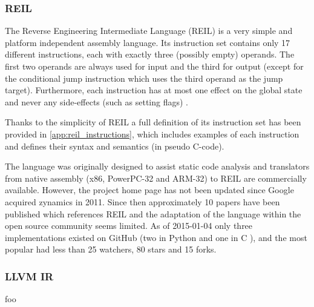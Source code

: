 
\subsubsection{REIL}

The Reverse Engineering Intermediate Language (REIL) is a very simple and platform independent assembly language. Its instruction set contains only 17 different instructions, each with exactly three (possibly empty) operands. The first two operands are always used for input and the third for output (except for the conditional jump instruction which uses the third operand as the jump target). Furthermore, each instruction has at most one effect on the global state and never any side-effects (such as setting flags) \cite{reil,reil_spec}.


Thanks to the simplicity of REIL a full definition of its instruction set has been provided in \cref{app:reil_instructions}, which includes examples of each instruction and defines their syntax and semantics (in pseudo C-code).


The language was originally designed to assist static code analysis and translators from native assembly (x86, PowerPC-32 and ARM-32) to REIL are commercially available. However, the project home page has not been updated since Google acquired zynamics in 2011. Since then approximately 10 papers have been published which references REIL and the adaptation of the language within the open source community seems limited. As of 2015-01-04 only three implementations existed on GitHub (two in Python \cite{barf,pyreil} and one in C \cite{bit}), and the most popular had less than 25 watchers, 80 stars and 15 forks.


\subsubsection{LLVM IR}

foo
